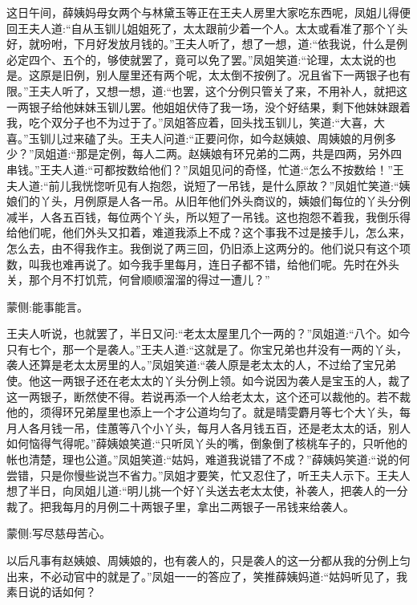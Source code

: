 \begin{parag}
    这日午间，薛姨妈母女两个与林黛玉等正在王夫人房里大家吃东西呢，凤姐儿得便回王夫人道:“自从玉钏儿姐姐死了，太太跟前少着一个人。太太或看准了那个丫头好，就吩咐，下月好发放月钱的。”王夫人听了，想了一想，道:“依我说，什么是例必定四个、五个的，够使就罢了，竟可以免了罢。”凤姐笑道:“论理，太太说的也是。这原是旧例，别人屋里还有两个呢，太太倒不按例了。况且省下一两银子也有限。”王夫人听了，又想一想，道:“也罢，这个分例只管关了来，不用补人，就把这一两银子给他妹妹玉钏儿罢。他姐姐伏侍了我一场，没个好结果，剩下他妹妹跟着我，吃个双分子也不为过于了。”凤姐答应着，回头找玉钏儿，笑道:“大喜，大喜。”玉钏儿过来磕了头。王夫人问道:“正要问你，如今赵姨娘、周姨娘的月例多少？”凤姐道:“那是定例，每人二两。赵姨娘有环兄弟的二两，共是四两，另外四串钱。”王夫人道:“可都按数给他们？”凤姐见问的奇怪，忙道:“怎么不按数给！”王夫人道:“前儿我恍惚听见有人抱怨，说短了一吊钱，是什么原故？”凤姐忙笑道:“姨娘们的丫头，月例原是人各一吊。从旧年他们外头商议的，姨娘们每位的丫头分例减半，人各五百钱，每位两个丫头，所以短了一吊钱。这也抱怨不着我，我倒乐得给他们呢，他们外头又扣着，难道我添上不成？这个事我不过是接手儿，怎么来，怎么去，由不得我作主。我倒说了两三回，仍旧添上这两分的。他们说只有这个项数，叫我也难再说了。如今我手里每月，连日子都不错，给他们呢。先时在外头关，那个月不打饥荒，何曾顺顺溜溜的得过一遭儿？”\begin{note}蒙侧:能事能言。\end{note}王夫人听说，也就罢了，半日又问:“老太太屋里几个一两的？”凤姐道:“八个。如今只有七个，那一个是袭人。”王夫人道:“这就是了。你宝兄弟也幷没有一两的丫头，袭人还算是老太太房里的人。”凤姐笑道:“袭人原是老太太的人，不过给了宝兄弟使。他这一两银子还在老太太的丫头分例上领。如今说因为袭人是宝玉的人，裁了这一两银子，断然使不得。若说再添一个人给老太太，这个还可以裁他的。若不裁他的，须得环兄弟屋里也添上一个才公道均匀了。就是晴雯麝月等七个大丫头，每月人各月钱一吊，佳蕙等八个小丫头，每月人各月钱五百，还是老太太的话，别人如何恼得气得呢。”薛姨娘笑道:“只听凤丫头的嘴，倒象倒了核桃车子的，只听他的帐也清楚，理也公道。”凤姐笑道:“姑妈，难道我说错了不成？”薛姨妈笑道:“说的何尝错，只是你慢些说岂不省力。”凤姐才要笑，忙又忍住了，听王夫人示下。王夫人想了半日，向凤姐儿道:“明儿挑一个好丫头送去老太太使，补袭人，把袭人的一分裁了。把我每月的月例二十两银子里，拿出二两银子一吊钱来给袭人。\begin{note}蒙侧:写尽慈母苦心。\end{note}以后凡事有赵姨娘、周姨娘的，也有袭人的，只是袭人的这一分都从我的分例上匀出来，不必动官中的就是了。”凤姐一一的答应了，笑推薛姨妈道:“姑妈听见了，我素日说的话如何？
\end{parag}
